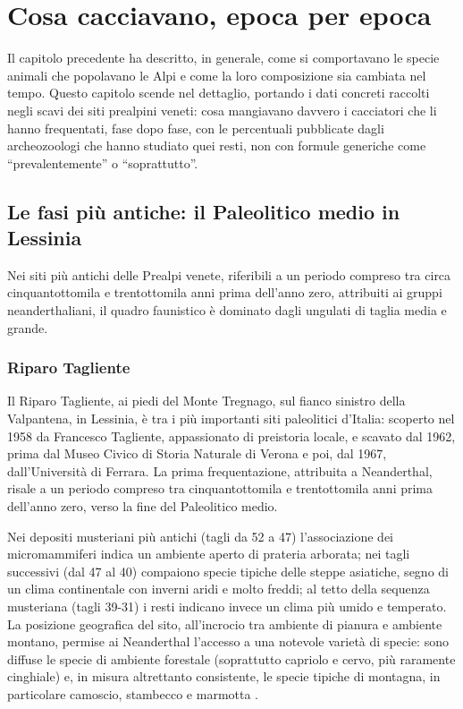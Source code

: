 \chapter{Cosa cacciavano, epoca per epoca}
\label{cap:cosa_cacciavano}

Il capitolo precedente ha descritto, in generale, come si comportavano le specie animali che popolavano le Alpi e come la loro composizione sia cambiata nel tempo. Questo capitolo scende nel dettaglio, portando i dati concreti raccolti negli scavi dei siti prealpini veneti: cosa mangiavano davvero i cacciatori che li hanno frequentati, fase dopo fase, con le percentuali pubblicate dagli archeozoologi che hanno studiato quei resti, non con formule generiche come ``prevalentemente'' o ``soprattutto''.

\section{Le fasi più antiche: il Paleolitico medio in Lessinia}

Nei siti più antichi delle Prealpi venete, riferibili a un periodo compreso tra circa cinquantottomila e trentottomila anni prima dell'anno zero, attribuiti ai gruppi neanderthaliani, il quadro faunistico è dominato dagli ungulati di taglia media e grande.

\subsection{Riparo Tagliente}

Il Riparo Tagliente, ai piedi del Monte Tregnago, sul fianco sinistro della Valpantena, in Lessinia, è tra i più importanti siti paleolitici d'Italia: scoperto nel 1958 da Francesco Tagliente, appassionato di preistoria locale, e scavato dal 1962, prima dal Museo Civico di Storia Naturale di Verona e poi, dal 1967, dall'Università di Ferrara. La prima frequentazione, attribuita a Neanderthal, risale a un periodo compreso tra cinquantottomila e trentottomila anni prima dell'anno zero, verso la fine del Paleolitico medio.

Nei depositi musteriani più antichi (tagli da 52 a 47) l'associazione dei micromammiferi indica un ambiente aperto di prateria arborata; nei tagli successivi (dal 47 al 40) compaiono specie tipiche delle steppe asiatiche, segno di un clima continentale con inverni aridi e molto freddi; al tetto della sequenza musteriana (tagli 39-31) i resti indicano invece un clima più umido e temperato. La posizione geografica del sito, all'incrocio tra ambiente di pianura e ambiente montano, permise ai Neanderthal l'accesso a una notevole varietà di specie: sono diffuse le specie di ambiente forestale (soprattutto capriolo e cervo, più raramente cinghiale) e, in misura altrettanto consistente, le specie tipiche di montagna, in particolare camoscio, stambecco e marmotta \citep{capuzzisala1980}.

